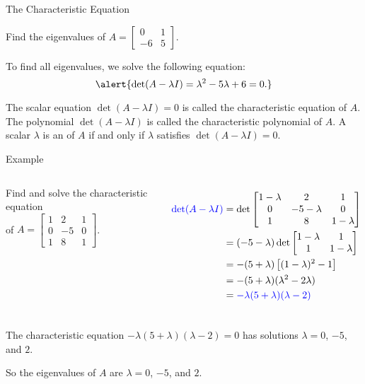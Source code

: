 \documentclass[xcolor=dvipsnames,aspectratio=169,t]{beamer}
\begin{document}
\begin{frame}{The Characteristic Equation}
  \bigskip

  Find the eigenvalues of $A = \begin{bmatrix} 0 & 1  \\ -6 & 5 \end{bmatrix}$.
  \bigskip
  
  \pause
  To find all eigenvalues, we solve the following equation:
  \[ \alert{\det  (A - \lambda I)  = \lambda^2 - 5 \lambda +6  = 0.} \]
  \vspace*{-1em}

  \bbox
  \bi 
  \ii The scalar equation \alert{$\det (A - \lambda I)=0$} is called the \alert{characteristic equation} of $A$.
  \smallskip
  \ii The polynomial  \alert{$\det (A - \lambda I)$} is called the \alert{characteristic polynomial} of $A$.
  \smallskip
  \ii A scalar $\lambda$ is an  of $A$ if and only if $\lambda$ satisfies $\det (A - \lambda I)=0$.
  \smallskip
  \ei
  \ebox
\end{frame}


\begin{frame}{Example}
  \medskip

  \begin{columns}[T]
  \column{0.5\tw}
  Find and solve the characteristic equation \\ \bigskip 
  \qquad of $A =\begin{bmatrix} 1 & 2 & 1 \\ 0 & -5 & 0 \\ 1 & 8 & 1\end{bmatrix}$.

  \pause
  \column{0.5\tw}
  \vspace*{-1em}
  \begin{align*}
  \textcolor{blue}{\det (A - \lambda I)}
  &= \det \begin{bmatrix} 1-\lambda & 2 & 1 \\ 0 & -5-\lambda & 0 \\ 1 & 8 & 1-\lambda \end{bmatrix}\\
  &= (-5-\lambda) \det \begin{bmatrix} 1 - \lambda & 1 \\ 1 & 1-\lambda \end{bmatrix} \\
  &= -(5 + \lambda)\left[ (1-\lambda)^2 -1 \right] \\
  &= -(5+\lambda) (\lambda^2-2\lambda)\\
  &= \textcolor{blue}{-\lambda(5+\lambda) (\lambda-2)}
  \end{align*}
  \end{columns}
  \bigskip

  The \alert{characteristic equation} $ -\lambda (5+\lambda) (\lambda-2)=0$ has solutions $\lambda =0$, $-5$, and $2$.
  \medskip
  
  So the eigenvalues of $A$ are $\lambda =0$, $-5$, and $2$.
\end{frame}
\end{document}
